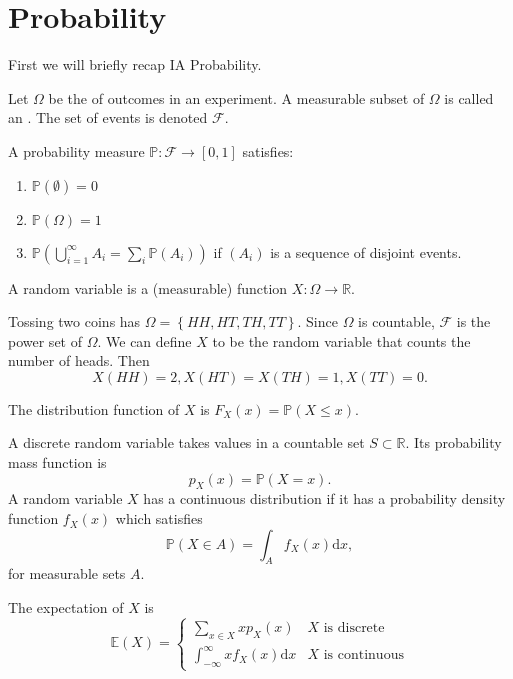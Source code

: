 \documentclass[a4paper]{scrartcl}
\begin{document}
\section{Probability}
First we will briefly recap IA Probability.

Let $\Omega$ be the  of outcomes in an experiment. A measurable subset of $\Omega$ is called an . The set of events is denoted $\mathcal{F}$. 
\begin{definition*}
     A probability measure $\mathbb{P}: \mathcal{F} \rightarrow [0,1]$ satisfies:
     \begin{enumerate}
         \item $\mathbb{P} (\emptyset)=0$ 
         \item $\mathbb{P}(\Omega)=1$
         \item $\mathbb{P}\left(\bigcup_{i=1}^{\infty} A_i= \sum_{i}^{}\mathbb{P} (A_i)\right)$ if $(A_i)$ is a sequence of disjoint events.   
     \end{enumerate} 
\end{definition*}
\begin{definition*}
     A random variable is a (measurable) function $X: \Omega \rightarrow \mathbb{R}$.
\end{definition*}
\begin{example*}
     Tossing two coins has $\Omega= \left\{HH,HT,TH,TT\right\}$. Since $\Omega$ is countable, $\mathcal{F}$ is the power set of $\Omega$. We can define $X$ to be the random variable that counts the number of heads. Then \[
     X (HH)=2, X (HT)=X (TH)=1, X (TT)=0
     .\] 
\end{example*}
\begin{definition*}
     The distribution function of $X$ is $F_X (x)=\mathbb{P} (X \leq x)$.
\end{definition*}
A discrete random variable takes values in a countable set $S \subset \mathbb{R}$. Its probability mass function is \[
p_X (x)=\mathbb{P}(X=x)
.\] 
A random variable $X$ has a continuous distribution if it has a probability density function $f_X (x)$ which satisfies \[
\mathbb{P} (X \in A)=\int_A f_X (x) \mathrm{d}x
,\]
for measurable sets $A$. 

The expectation of $X$ is 
\begin{equation*}
     \mathbb{E} (X)=
     \begin{cases}
         \sum_{x \in X}^{}x p_X (x) & X \text{ is discrete} \\
         \int_{-\infty }^{\infty} x f_X (x)\mathrm{d}x & X \text{ is continuous}
     \end{cases}
\end{equation*}
\end{document}
